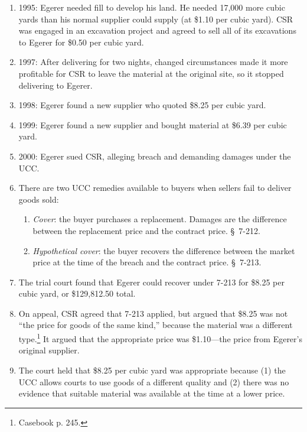 \begin{enumerate}
    \item 1995: Egerer needed fill to develop his land. He needed 17,000 more 
    cubic yards than his normal supplier could supply (at \$1.10 per cubic 
    yard).  CSR was engaged in an excavation project and agreed to sell all of 
    its 
    excavations to Egerer for \$0.50 per cubic yard.
    \item 1997: After delivering for two nights, changed circumstances made it 
    more 
    profitable for CSR to leave the material at the original site, so it 
    stopped delivering to Egerer.
    \item 1998: Egerer found a new supplier who quoted \$8.25 per cubic yard.
    \item 1999: Egerer found a new supplier and bought material at \$6.39 per 
    cubic yard.
    \item 2000: Egerer sued CSR, alleging breach and demanding damages under 
    the UCC.
    \item There are two UCC remedies available to buyers when sellers fail to 
    deliver goods sold:
    \begin{enumerate}
        \item \emph{Cover}: the buyer purchases a replacement. Damages are the 
        difference between the replacement price and the contract price. \S\ 
        7-212.
        \item \emph{Hypothetical cover}: the buyer recovers the difference 
        between the market price at the time of the breach and the contract 
        price. \S\ 7-213.
    \end{enumerate}
    \item The trial court found that Egerer could recover under 7-213 for 
    \$8.25 per cubic yard, or \$129,812.50 total.
    \item On appeal, CSR agreed that 7-213 applied, but argued that \$8.25 was 
    not ``the price for goods of the same kind,'' because the material was a 
    different type.\footnote{Casebook p. 245.} It argued that the appropriate 
    price was \$1.10---the price from Egerer's original supplier.
    \item The court held that \$8.25 per cubic yard was appropriate because 
    (1) the UCC allows courts to use goods of a different quality and (2) 
    there was no evidence that suitable material was available at the time at 
    a lower price.
\end{enumerate}

